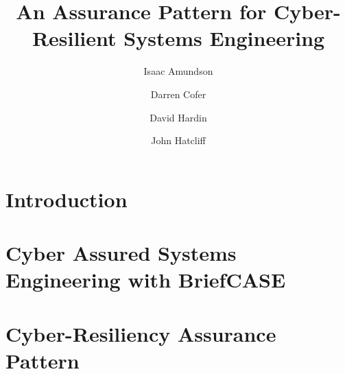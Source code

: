 \documentclass[runningheads]{llncs}
\begin{document}
\title{An Assurance Pattern for Cyber-Resilient Systems Engineering}

\author{
	Isaac Amundson 
	\and Darren Cofer 
	\and David Hardin 
	\and John Hatcliff}



\maketitle

\begin{abstract}

\end{abstract}


\section{Introduction}
\label{sec:introduction}





%

\section{Cyber Assured Systems Engineering with BriefCASE}
\label{sec:briefcase}


\section{Cyber-Resiliency Assurance Pattern}
\label{sec:assurance-pattern}

\end{document}
